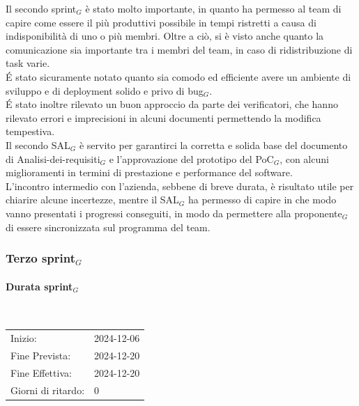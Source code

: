 \documentclass[10pt]{article}
\begin{document}
{{{    Il secondo sprint$_G$ è stato molto importante, in quanto ha permesso al team di capire come essere il più produttivi possibile in tempi ristretti a causa di indisponibilità di uno o più membri. Oltre a ciò, si è visto anche quanto la comunicazione sia importante tra i membri del team, in caso di ridistribuzione di task varie.\\ 
    \'E stato sicuramente notato quanto sia comodo ed efficiente avere un ambiente di sviluppo e di deployment solido e privo di bug$_G$.\\ 
    \'E stato inoltre rilevato un buon approccio da parte dei verificatori, che hanno rilevato errori e imprecisioni in alcuni documenti permettendo la modifica tempestiva.\\ 
    Il secondo SAL$_G$ è servito per garantirci la corretta e solida base del documento di Analisi-dei-requisiti$_G$ e l'approvazione del prototipo del PoC$_G$, con alcuni miglioramenti in termini di prestazione e performance del software.\\ 
    L'incontro intermedio con l'azienda, sebbene di breve durata, è risultato utile per chiarire alcune incertezze, mentre il SAL$_G$ ha permesso di capire in che modo vanno presentati i progressi conseguiti, in modo da permettere alla proponente$_G$ di essere sincronizzata sul programma del team.
    

\newpage
\subsubsection{Terzo sprint$_G$}
\label{terzo-sprint$_G$}
    
    \paragraph{Durata sprint$_G$}\mbox{}\\
    \vspace{-1.5em}
    \begin{table}[h] 
    \renewcommand{\arraystretch}{1.2}  
    \begin{tabular}{ l l }
        Inizio: & 2024-12-06 \\
        Fine Prevista: & 2024-12-20 \\
        Fine Effettiva: & 2024-12-20 \\
        Giorni di ritardo: & 0 \\
    \end{tabular}
    \end{table}
    \vspace{-2em}
    {\renewcommand{\arraystretch}{1.5}%
    
}}}}
\end{document}
